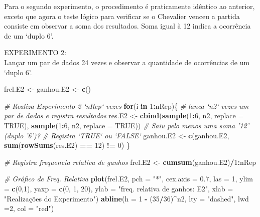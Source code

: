 \documentclass[
]{book}
\newenvironment{Shaded}{\begin{snugshade}}{\end{snugshade}}
\newcommand{\CommentTok}[1]{\textcolor[rgb]{0.56,0.35,0.01}{\textit{#1}}}
\newcommand{\ControlFlowTok}[1]{\textcolor[rgb]{0.13,0.29,0.53}{\textbf{#1}}}
\newcommand{\DataTypeTok}[1]{\textcolor[rgb]{0.13,0.29,0.53}{#1}}
\newcommand{\DecValTok}[1]{\textcolor[rgb]{0.00,0.00,0.81}{#1}}
\newcommand{\FloatTok}[1]{\textcolor[rgb]{0.00,0.00,0.81}{#1}}
\newcommand{\KeywordTok}[1]{\textcolor[rgb]{0.13,0.29,0.53}{\textbf{#1}}}
\newcommand{\NormalTok}[1]{#1}
\newcommand{\OperatorTok}[1]{\textcolor[rgb]{0.81,0.36,0.00}{\textbf{#1}}}
\newcommand{\OtherTok}[1]{\textcolor[rgb]{0.56,0.35,0.01}{#1}}
\newcommand{\StringTok}[1]{\textcolor[rgb]{0.31,0.60,0.02}{#1}}
\theoremstyle{definition}
\theoremstyle{definition}
\theoremstyle{definition}
\theoremstyle{remark}
\begin{document}
Para o segundo experimento, o procedimento é praticamente idêntico ao anterior, exceto que agora o teste lógico para verificar se o Chevalier venceu a partida consiste em observar a soma dos resultados. Soma igual à 12 indica a ocorrência de um `duplo 6'.

EXPERIMENTO 2:\\
Lançar um par de dados 24 vezes e observar a quantidade de ocorrências de um `duplo 6'.

\begin{Shaded}
\begin{Highlighting}[]
\NormalTok{frel.E2 <-}\StringTok{ }\NormalTok{ganhou.E2 <-}\StringTok{ }\KeywordTok{c}\NormalTok{()}

\CommentTok{# Realiza Experimento 2 `nRep` vezes}
\ControlFlowTok{for}\NormalTok{(i }\ControlFlowTok{in} \DecValTok{1}\OperatorTok{:}\NormalTok{nRep)\{}
  \CommentTok{# lanca `n2`  vezes um par de dados e registra resultados}
\NormalTok{  res.E2 <-}\StringTok{ }\KeywordTok{cbind}\NormalTok{(}\KeywordTok{sample}\NormalTok{(}\DecValTok{1}\OperatorTok{:}\DecValTok{6}\NormalTok{, n2, }\DataTypeTok{replace =} \OtherTok{TRUE}\NormalTok{), }
                  \KeywordTok{sample}\NormalTok{(}\DecValTok{1}\OperatorTok{:}\DecValTok{6}\NormalTok{, n2, }\DataTypeTok{replace =} \OtherTok{TRUE}\NormalTok{)) }
  \CommentTok{# Saiu pelo menos uma soma '12' (duplo '6')?}
  \CommentTok{# Registra `TRUE` ou `FALSE`}
\NormalTok{  ganhou.E2 <-}\StringTok{ }\KeywordTok{c}\NormalTok{(ganhou.E2, }\KeywordTok{sum}\NormalTok{(}\KeywordTok{rowSums}\NormalTok{(res.E2) }\OperatorTok{==}\StringTok{ }\DecValTok{12}\NormalTok{) }\OperatorTok{!=}\StringTok{ }\DecValTok{0}\NormalTok{)}
\NormalTok{\}}

\CommentTok{# Registra frequencia relativa de ganhos    }
\NormalTok{frel.E2 <-}\StringTok{ }\KeywordTok{cumsum}\NormalTok{(ganhou.E2)}\OperatorTok{/}\DecValTok{1}\OperatorTok{:}\NormalTok{nRep}

\CommentTok{# Gráfico de Freq. Relativa}
\KeywordTok{plot}\NormalTok{(frel.E2, }\DataTypeTok{pch =} \StringTok{"*"}\NormalTok{, }\DataTypeTok{cex.axis =} \FloatTok{0.7}\NormalTok{, }\DataTypeTok{las =} \DecValTok{1}\NormalTok{, }
     \DataTypeTok{ylim =} \KeywordTok{c}\NormalTok{(}\DecValTok{0}\NormalTok{,}\DecValTok{1}\NormalTok{), }\DataTypeTok{yaxp =} \KeywordTok{c}\NormalTok{(}\DecValTok{0}\NormalTok{, }\DecValTok{1}\NormalTok{, }\DecValTok{20}\NormalTok{),}
     \DataTypeTok{ylab =} \StringTok{"freq. relativa de ganhos: E2"}\NormalTok{, }\DataTypeTok{xlab =} \StringTok{"Realizações do Experimento"}\NormalTok{)}
\KeywordTok{abline}\NormalTok{(}\DataTypeTok{h =} \DecValTok{1} \OperatorTok{-}\StringTok{ }\NormalTok{(}\DecValTok{35}\OperatorTok{/}\DecValTok{36}\NormalTok{)}\OperatorTok{^}\NormalTok{n2, }\DataTypeTok{lty =} \StringTok{"dashed"}\NormalTok{, }\DataTypeTok{lwd =}\DecValTok{2}\NormalTok{, }\DataTypeTok{col =} \StringTok{"red"}\NormalTok{)}
\end{Highlighting}
\end{Shaded}
\end{document}
